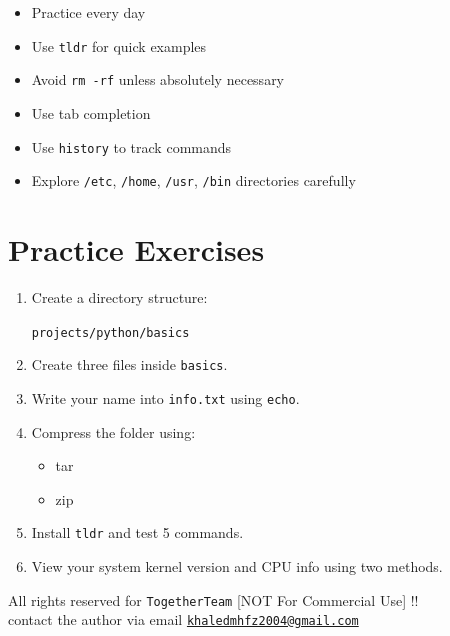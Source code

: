 \documentclass[12pt]{article}
\begin{document}
\begin{itemize}
    \item Practice every day
    \item Use \texttt{tldr} for quick examples
    \item Avoid \texttt{rm -rf} unless absolutely necessary
    \item Use tab completion
    \item Use \texttt{history} to track commands
    \item Explore \texttt{/etc}, \texttt{/home}, \texttt{/usr}, \texttt{/bin} directories carefully
\end{itemize}

\section*{Practice Exercises}

\begin{enumerate}
    \item Create a directory structure:
    
    \begin{highlightbox}
    \texttt{projects/python/basics}
    \end{highlightbox}
    
    \item Create three files inside \texttt{basics}.
    
    \item Write your name into \texttt{info.txt} using \texttt{echo}.
    
    \item Compress the folder using:
    \begin{itemize}
        \item tar
        \item zip
    \end{itemize}
    
    \item Install \texttt{tldr} and test 5 commands.
    
    \item View your system kernel version and CPU info using two methods.
\end{enumerate}

\vspace{\fill}
\begin{center}
\color{muted}
All rights reserved for \texttt{TogetherTeam} [NOT For Commercial Use] !!\\
contact the author via email \href{mailto:khaledmhfz2004@gmail.com}{\texttt{khaledmhfz2004@gmail.com}}
\end{center}
\end{document}
